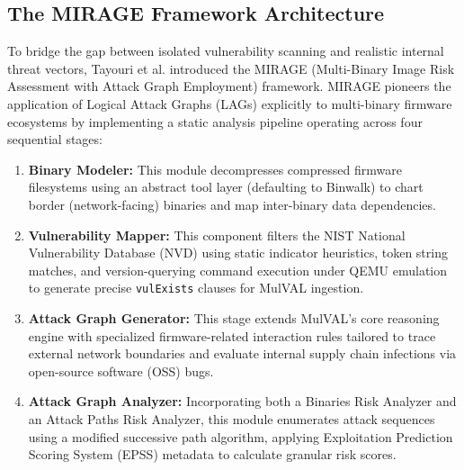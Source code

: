 \documentclass[target=mst,aauheader=aics,style=]{thud}
\begin{document}
\subsection{The MIRAGE Framework Architecture}
To bridge the gap between isolated vulnerability scanning and realistic internal threat vectors, Tayouri et al. introduced the MIRAGE (Multi-Binary Image Risk Assessment with Attack Graph Employment) framework. MIRAGE pioneers the application of Logical Attack Graphs (LAGs) explicitly to multi-binary firmware ecosystems by implementing a static analysis pipeline operating across four sequential stages: 
\begin{enumerate}
    \item \textbf{Binary Modeler:} This module decompresses compressed firmware filesystems using an abstract tool layer (defaulting to Binwalk) to chart border (network-facing) binaries and map inter-binary data dependencies. 
    \item \textbf{Vulnerability Mapper:} This component filters the NIST National Vulnerability Database (NVD) using static indicator heuristics, token string matches, and version-querying command execution under QEMU emulation to generate precise \texttt{vulExists} clauses for MulVAL ingestion. 
    \item \textbf{Attack Graph Generator:} This stage extends MulVAL’s core reasoning engine with specialized firmware-related interaction rules tailored to trace external network boundaries and evaluate internal supply chain infections via open-source software (OSS) bugs. 
    \item \textbf{Attack Graph Analyzer:} Incorporating both a Binaries Risk Analyzer and an Attack Paths Risk Analyzer, this module enumerates attack sequences using a modified successive path algorithm, applying Exploitation Prediction Scoring System (EPSS) metadata to calculate granular risk scores. 
\end{enumerate}
\end{document}
